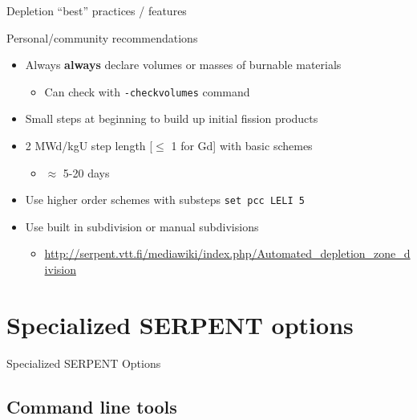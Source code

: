 \documentclass{beamer}
\begin{document}
\begin{frame}{Depletion ``best'' practices / features}
    \centerline{Personal/community recommendations}
    \begin{itemize}
        \item Always \textbf{always} declare volumes or masses of burnable materials
        \begin{itemize}
            \item Can check with \texttt{-checkvolumes} command
        \end{itemize}
        \item Small steps at beginning to build up initial fission products
        \item 2 MWd/kgU step length [$\leq$ 1 for Gd] with basic schemes
        \begin{itemize}
            \item $\approx$ 5-20 days
        \end{itemize}
        \item Use higher order schemes with substeps \texttt{set pcc LELI 5}
        \item Use built in subdivision or manual subdivisions
        \begin{itemize}
            \item \url{http://serpent.vtt.fi/mediawiki/index.php/Automated\_depletion\_zone\_division}
        \end{itemize}
    \end{itemize}
\end{frame}

\section{Specialized SERPENT options}

\begin{frame}{Specialized SERPENT Options}
    \tableofcontents[sectionstyle=show/hide,subsectionstyle=show/show/hide]
\end{frame}

\subsection{Command line tools}
\end{document}
